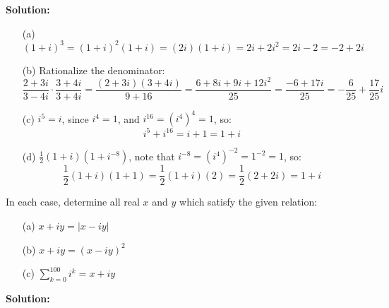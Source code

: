 \textbf{Solution:}

\begin{itemize}
\item[(a)] \( (1 + i)^3 = (1 + i)^2 (1 + i) = (2i)(1 + i) = 2i + 2i^2 = 2i - 2 = -2 + 2i \)

\item[(b)] Rationalize the denominator:
\[
\frac{2 + 3i}{3 - 4i} \cdot \frac{3 + 4i}{3 + 4i} = \frac{(2 + 3i)(3 + 4i)}{9 + 16} = \frac{6 + 8i + 9i + 12i^2}{25} = \frac{-6 + 17i}{25} = -\frac{6}{25} + \frac{17}{25}i
\]

\item[(c)] \( i^5 = i \), since \( i^4 = 1 \), and \( i^{16} = (i^4)^4 = 1 \), so:
\[
i^5 + i^{16} = i + 1 = 1 + i
\]

\item[(d)] \( \frac{1}{2}(1 + i)(1 + i^{-8}) \), note that \( i^{-8} = (i^4)^{-2} = 1^{-2} = 1 \), so:
\[
\frac{1}{2}(1 + i)(1 + 1) = \frac{1}{2}(1 + i)(2) = \frac{1}{2}(2 + 2i) = 1 + i
\]
\end{itemize}


\begin{problembox}
In each case, determine all real \( x \) and \( y \) which satisfy the given relation:

\begin{enumerate}
\item[(a)] \( x + iy = |x - iy| \)
\item[(b)] \( x + iy = (x - iy)^2 \)
\item[(c)] \( \sum_{k=0}^{100} i^k = x + iy \)
\end{enumerate}
\end{problembox}

\textbf{Solution:}

